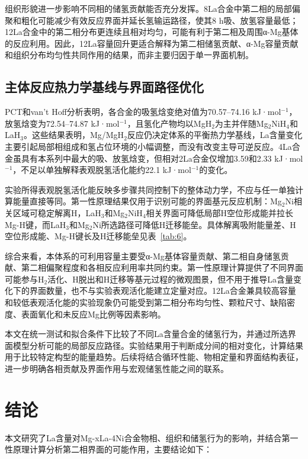 \documentclass[preprint,12pt]{elsarticle}
\begin{document}
组织形貌进一步影响不同相的储氢贡献能否充分发挥。8La合金中第二相的局部偏聚和粗化可能减少有效反应界面并延长氢输运路径，使其8 h吸、放氢容量最低；12La合金中的第二相分布更连续且相对均匀，可能有利于第二相及周围α-Mg基体的反应利用。因此，12La容量回升更适合解释为第二相储氢贡献、α-Mg容量贡献和组织分布均匀性共同作用的结果，而非主要归因于单一界面机制。

\subsection{主体反应热力学基线与界面路径优化}

PCT和van’t Hoff分析表明，各合金的吸氢焓变绝对值为70.57–74.16 kJ·mol$^{-1}$，放氢焓变为72.54–74.87 kJ·mol$^{-1}$，且氢化产物均以MgH$_{\mathrm{2}}$为主并伴随Mg$_{\mathrm{2}}$NiH$_{\mathrm{4}}$和LaH$_{\mathrm{3}}$。这些结果表明，Mg/MgH$_{\mathrm{2}}$反应仍决定体系的平衡热力学基线，La含量变化主要引起局部相组成和氢占位环境的小幅调整，而没有改变主导可逆反应。4La合金虽具有本系列中最大的吸、放氢焓变，但相对2La合金仅增加3.59和2.33 kJ·mol$^{-1}$，不足以单独解释表观脱氢活化能约22.1 kJ·mol$^{-1}$的变化。

实验所得表观脱氢活化能反映多步骤共同控制下的整体动力学，不应与任一单独计算能量直接等同。第一性原理结果仅用于识别可能的界面基元反应机制：Mg$_{\mathrm{2}}$Ni相关区域可稳定解离H，LaH$_{\mathrm{3}}$和Mg$_{\mathrm{2}}$NiH$_{\mathrm{4}}$相关界面可降低局部H空位形成能并拉长Mg-H键，而LaH$_{\mathrm{3}}$和Mg$_{\mathrm{2}}$Ni所选路径可降低H迁移能垒。具体解离吸附能量差、H空位形成能、Mg-H键长及H迁移能垒见表~\ref{tab:6}。

综合来看，本体系的可利用容量主要受α-Mg基体容量贡献、第二相自身储氢贡献、第二相偏聚程度和各相反应利用率共同约束。第一性原理计算提供了不同界面可能参与H$_{\mathrm{2}}$活化、H脱出和H迁移等基元过程的微观图景，但不用于推导La含量变化下的界面数量，也不与实验表观活化能建立定量对应。12La合金兼具较高容量和较低表观活化能的实验现象仍可能受到第二相分布均匀性、颗粒尺寸、缺陷密度、表面氧化和未反应Mg比例等因素影响。

本文在统一测试和拟合条件下比较了不同La含量合金的储氢行为，并通过所选界面模型分析可能的局部反应路径。实验结果用于判断成分间的相对变化，计算结果用于比较特定构型的能量趋势。后续将结合循环性能、物相定量和界面结构表征，进一步明确各相贡献及界面作用与宏观储氢性能之间的联系。

\section{结论}

本文研究了La含量对Mg-xLa-4Ni合金物相、组织和储氢行为的影响，并结合第一性原理计算分析第二相界面的可能作用，主要结论如下：
\end{document}
